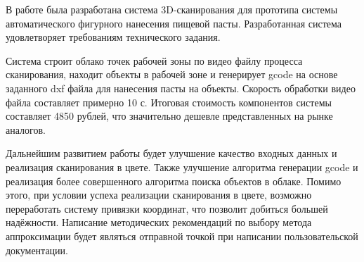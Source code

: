 \conclusion
В работе была разработана система 3D-сканирования для прототипа системы автоматического фигурного нанесения пищевой пасты. Разработанная система удовлетворяет требованиям технического задания.

Система строит облако точек рабочей зоны по видео файлу процесса сканирования, находит объекты в рабочей зоне и генерирует gcode на основе заданного dxf файла для нанесения пасты на объекты. Скорость обработки видео файла составляет примерно 10 с. Итоговая стоимость компонентов системы составляет 4850 рублей, что значительно дешевле представленных на рынке аналогов.

Дальнейшим развитием работы будет улучшение качество входных данных и реализация сканирования в цвете. Также улучшение алгоритма генерации gcode и реализация более совершенного алгоритма поиска объектов в облаке. Помимо этого, при условии успеха реализации сканирования в цвете, возможно переработать систему привязки координат, что позволит добиться большей надёжности. Написание методических рекомендаций по выбору метода аппроксимации будет являться отправной точкой при написании пользовательской документации.